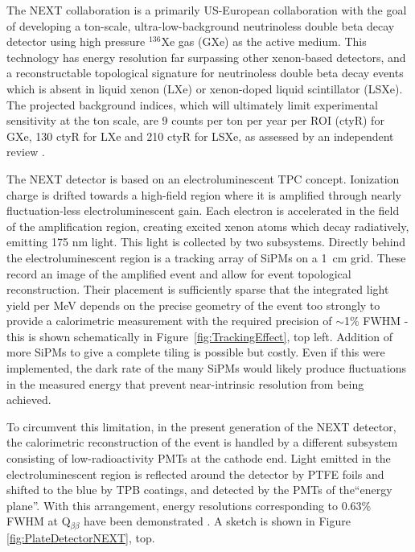 The NEXT collaboration is a primarily US-European collaboration with the goal of developing a ton-scale, ultra-low-background neutrinoless double beta decay detector using high pressure $^{136}$Xe gas (GXe) as the active medium.  This technology has energy resolution far surpassing other xenon-based detectors, and a reconstructable topological signature for neutrinoless double beta decay events which is absent in liquid xenon (LXe) or xenon-doped liquid scintillator (LSXe).  The projected background indices, which will ultimately limit experimental sensitivity at the ton scale, are 9 counts per ton per year per ROI (ctyR) for GXe, 130 ctyR for LXe and 210 ctyR for LSXe, as assessed by an independent review \cite{LRP}.

The NEXT detector is based on an electroluminescent TPC concept. Ionization charge is drifted towards a high-field region where it is amplified through nearly fluctuation-less electroluminescent gain.  Each electron is accelerated in the field of the amplification region, creating excited xenon atoms which decay radiatively, emitting 175 nm light.  This light is collected by two subsystems. Directly behind the electroluminescent region is a tracking array of SiPMs on a 1~cm grid.  These record an image of the amplified event and allow for event topological reconstruction.  Their placement is sufficiently sparse that the integrated light yield per MeV depends on the precise geometry of the event too strongly to provide a calorimetric measurement with the required precision of $\sim$1\% FWHM - this is shown schematically in Figure~\ref{fig:TrackingEffect}, top left.  Addition of more SiPMs to give a complete tiling is possible but costly.  Even if this were implemented, the dark rate of the many SiPMs would likely produce fluctuations in the measured energy that prevent near-intrinsic resolution from being achieved.  

To circumvent this limitation, in the present generation of the NEXT detector, the calorimetric reconstruction of the event is handled by a different subsystem consisting of low-radioactivity PMTs at the cathode end.  Light emitted in the electroluminescent region is reflected around the detector by PTFE foils and shifted to the blue by TPB coatings, and detected by the PMTs of the``energy plane''.  With this arrangement, energy resolutions corresponding to  0.63\% FWHM at Q$_{\beta\beta}$ have been demonstrated \cite{Alvarez:2012yxw}.  A sketch is shown in Figure~ \ref{fig:PlateDetectorNEXT}, top.






